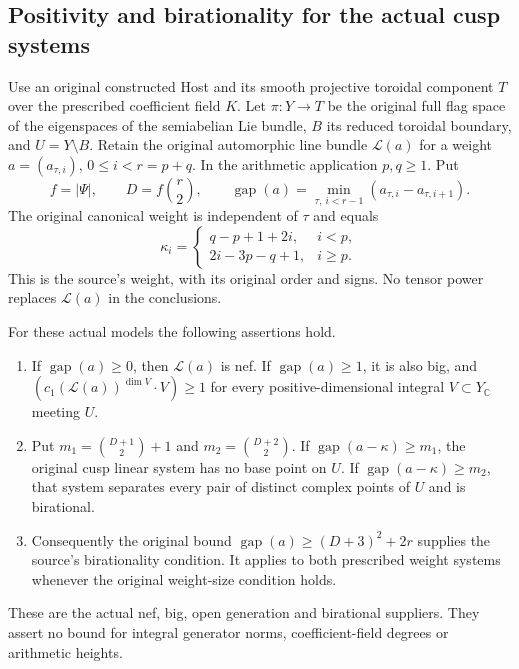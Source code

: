 \subsection{Positivity and birationality for the actual cusp systems}
\label{actual-geometric-positivity}

Use an original constructed Host and its smooth projective toroidal
component $T$ over the prescribed coefficient field $K$. Let
$\pi:Y\to T$ be the original full flag space of the eigenspaces of
the semiabelian Lie bundle, $B$ its reduced toroidal boundary, and
$U=Y\setminus B$. Retain the original automorphic line bundle
$\mathcal L(a)$ for a weight $a=(a_{\tau,i})$, $0\le i<r=p+q$.
In the arithmetic application $p,q\ge1$. Put
\[
 f=|\Psi|,\qquad D=f\binom r2,\qquad
 \operatorname{gap}(a)=\min_{\tau,\ i<r-1}(a_{\tau,i}-a_{\tau,i+1}).
\]
The original canonical weight is independent of $\tau$ and equals
\begin{equation}\label{actual-positive-kappa}
 \kappa_i=\begin{cases}
 q-p+1+2i,&i<p,\\
 2i-3p-q+1,&i\ge p.
 \end{cases}
\end{equation}
This is the source's weight, with its original order and signs.
No tensor power replaces $\mathcal L(a)$ in the conclusions.

\begin{theorem}\label{actual-positive-cusp-theorem}
For these actual models the following assertions hold.
\begin{enumerate}
\item If $\operatorname{gap}(a)\ge0$, then $\mathcal L(a)$ is nef.
If $\operatorname{gap}(a)\ge1$, it is also big, and
$(c_1(\mathcal L(a))^{\dim V}\cdot V)\ge1$ for every
positive-dimensional integral $V\subset Y_{\mathbb C}$ meeting $U$.
\item Put $m_1=\binom{D+1}{2}+1$ and $m_2=\binom{D+2}{2}$.
If $\operatorname{gap}(a-\kappa)\ge m_1$, the original cusp
linear system has no base point on $U$. If
$\operatorname{gap}(a-\kappa)\ge m_2$, that system separates
every pair of distinct complex points of $U$ and is birational.
\item Consequently the original bound
$\operatorname{gap}(a)\ge(D+3)^2+2r$ supplies the source's
birationality condition. It applies to both prescribed weight
systems whenever the original weight-size condition holds.
\end{enumerate}
These are the actual nef, big, open generation and birational
suppliers. They assert no bound for integral generator norms,
coefficient-field degrees or arithmetic heights.
\end{theorem}


